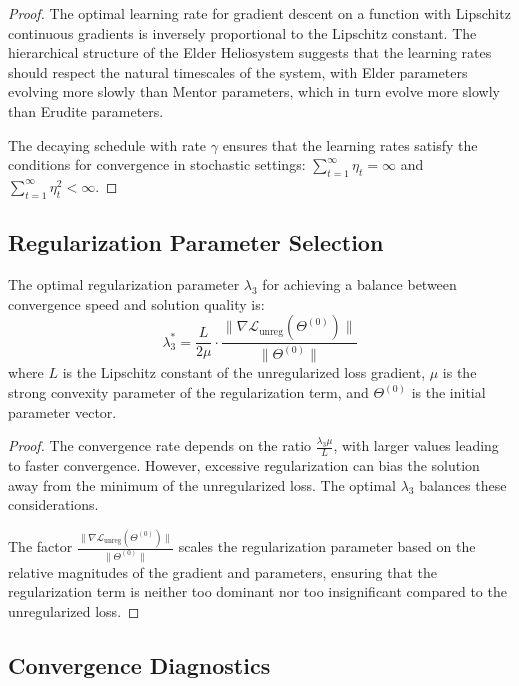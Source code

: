 \begin{proof}
The optimal learning rate for gradient descent on a function with Lipschitz continuous gradients is inversely proportional to the Lipschitz constant. The hierarchical structure of the Elder Heliosystem suggests that the learning rates should respect the natural timescales of the system, with Elder parameters evolving more slowly than Mentor parameters, which in turn evolve more slowly than Erudite parameters.

The decaying schedule with rate $\gamma$ ensures that the learning rates satisfy the conditions for convergence in stochastic settings: $\sum_{t=1}^{\infty} \eta_t = \infty$ and $\sum_{t=1}^{\infty} \eta_t^2 < \infty$.
\end{proof}

\subsection{Regularization Parameter Selection}

\begin{theorem}
The optimal regularization parameter $\lambda_3$ for achieving a balance between convergence speed and solution quality is:
\begin{equation}
\lambda_3^* = \frac{L}{2\mu} \cdot \frac{\|\nabla \mathcal{L}_{\text{unreg}}(\Theta^{(0)})\|}{\|\Theta^{(0)}\|}
\end{equation}
where $L$ is the Lipschitz constant of the unregularized loss gradient, $\mu$ is the strong convexity parameter of the regularization term, and $\Theta^{(0)}$ is the initial parameter vector.
\end{theorem}

\begin{proof}
The convergence rate depends on the ratio $\frac{\lambda_3 \mu}{L}$, with larger values leading to faster convergence. However, excessive regularization can bias the solution away from the minimum of the unregularized loss. The optimal $\lambda_3$ balances these considerations.

The factor $\frac{\|\nabla \mathcal{L}_{\text{unreg}}(\Theta^{(0)})\|}{\|\Theta^{(0)}\|}$ scales the regularization parameter based on the relative magnitudes of the gradient and parameters, ensuring that the regularization term is neither too dominant nor too insignificant compared to the unregularized loss.
\end{proof}

\subsection{Convergence Diagnostics}

